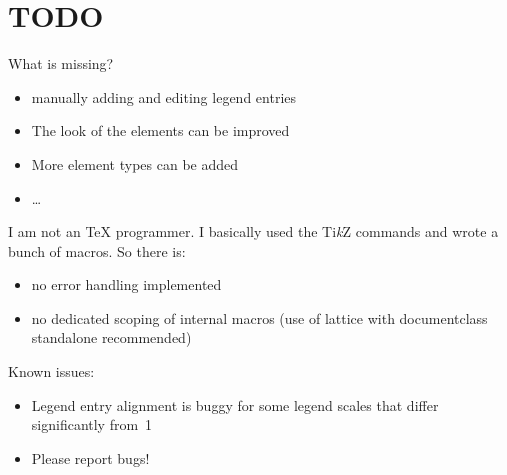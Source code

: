 \documentclass[a4paper]{scrartcl}
\newcommand{\tikzlabel}{Ti\textit{k}Z}
\begin{document}
\clearpage
\section{TODO}
\label{sec:todo}

What is missing? 
\begin{itemize}
\item manually adding and editing legend entries
\item The look of the elements can be improved
\item More element types can be added
\item \ldots{}
\end{itemize}

I am not an \TeX{} programmer. I basically used the \tikzlabel{} commands and wrote a
bunch of macros. So there is:
\begin{itemize}
\item no error handling implemented
\item no dedicated scoping of internal macros (use of lattice with documentclass standalone recommended)
\end{itemize}

Known issues:
\begin{itemize}
\item Legend entry alignment is buggy for some legend scales that differ significantly
  from~1
\item Please report bugs!
\end{itemize}
\end{document}
